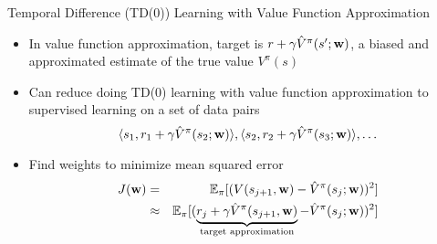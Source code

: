 \documentclass[aspectratio=169]{../latex_main/tntbeamer}  %
\begin{document}
\begin{frame}[c]{Temporal Difference (TD(0)) Learning with Value
		Function Approximation}
	
	\begin{itemize}
		\item In value function approximation, target is $r + \gamma \hat{V}^\pi (s'; \mathbf{w})$, a biased and approximated estimate of the true value $V^\pi(s)$
		\item Can reduce doing TD(0) learning with value function approximation to supervised learning on a set of data pairs
		$$\langle  s_1, r_1+ \gamma \hat{V}^\pi (s_2; \mathbf{w}) \rangle, \langle  s_2, r_2+ \gamma \hat{V}^\pi (s_3; \mathbf{w}) \rangle, \ldots $$
		\item Find weights to minimize mean squared error
		\begin{eqnarray*}
		J(\mathbf{w}) &=& \mathbb{E}_\pi [(V(s_{j+1}, \mathbf{w}) - \hat{V}^\pi(s_j;\mathbf{w}))^2]\\ 
		&\approx& \mathbb{E}_\pi [(\underbrace{r_j + \gamma \hat{V}^\pi(s_{j+1}, \mathbf{w})}_{\text{target approximation}} - \hat{V}^\pi(s_j;\mathbf{w}))^2]
		\end{eqnarray*}
		
	\end{itemize}
	
\end{frame}
\end{document}
